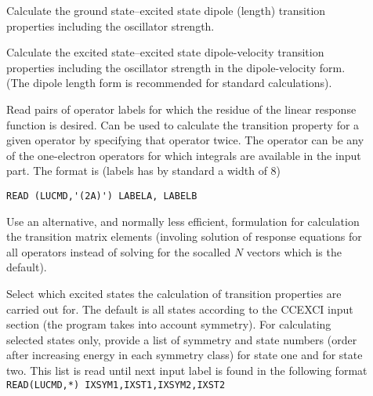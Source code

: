 \begin{description}
\item[]

Calculate the ground state--excited state dipole (length) transition properties including
the oscillator strength.

\item[]

Calculate the excited state--excited state dipole-velocity  transition properties including
the oscillator strength in the dipole-velocity form. (The dipole length form is recommended
for standard calculations).

\item[]

Read pairs of operator labels for which the residue of the linear response
function is desired.
Can be used to calculate the transition property for a given operator
by specifying that operator twice. The operator can be any of the one-electron
operators for which integrals are available in the  input part.
The format is  (labels has by standard a width of 8)

   \verb|READ (LUCMD,'(2A)') LABELA, LABELB|\newline


\item[]

Use an alternative, and normally less efficient, formulation for calculation
the transition matrix elements (involing solution of response equations for
all operators instead of solving for the socalled $N$ vectors which is the default).

\item[]

Select which excited states the calculation of transition properties
are carried out for. The default is all states according to the CCEXCI input section
(the program takes into account symmetry). For calculating selected states only,
provide a list of symmetry and state numbers (order after increasing energy in
each symmetry class) for state one and for state two.
This list is read until next input label is found in the following format\\

\verb|READ(LUCMD,*) IXSYM1,IXST1,IXSYM2,IXST2|\newline 

\end{description}

